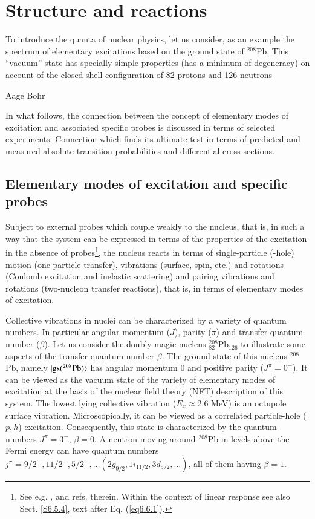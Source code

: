\chapter{Structure and reactions}\label{intro}
\epigraph{To introduce the quanta of nuclear physics, let us consider, as an example the spectrum of elementary excitations based on the ground state of $^{208}$Pb. This ``vacuum'' state has specially simple properties (has a minimum of degeneracy) on account of the closed-shell configuration of 82 protons and 126 neutrons}{Aage Bohr}
In what follows, the connection between the concept of elementary modes of excitation and associated specific probes is discussed in terms of selected experiments. Connection which finds its ultimate test in terms of predicted and measured absolute transition probabilities and differential cross sections. 
 \section{Elementary modes of excitation and specific probes}\label{S1.1}
Subject to external probes which couple weakly to the nucleus, that is, in such a way that the system can be expressed in terms of the properties of the excitation in the absence of probes\footnote{\label{f1C2} See e.g. \cite{Pines:66},\cite{Bohr:75} and refs. therein. Within the context of linear response see also Sect. \ref{S6.5.4}, text after Eq. (\ref{eq6.6.1}).}, the nucleus reacts  in terms  of single-particle (-hole) motion (one-particle transfer), vibrations (surface, spin, etc.) and rotations (Coulomb excitation and inelastic scattering) and pairing vibrations and rotations (two-nucleon transfer reactions), that is, in terms of elementary modes of excitation.


Collective vibrations in nuclei can be characterized by a variety of quantum numbers. In particular angular momentum ($J$), parity ($\pi$) and transfer quantum number ($\beta$). Let us consider the doubly magic nucleus $^{208}_{82}$Pb$_{126}$ to illustrate some aspects of the transfer quantum number $\beta$. The ground state of this nucleus $^{208}$Pb, namely $|{\text{gs}(^{208}\text{Pb})} \rangle$ has angular momentum 0 and positive parity ($J^\pi=0^+$). It can be viewed as the vacuum state of the variety of elementary modes of excitation at the basis of the nuclear field theory (NFT) description of this system. The lowest lying collective vibration ($E_x\approx2.6$ MeV) is an octupole surface vibration. Microscopically, it can be viewed as a correlated particle-hole ($p,h$) excitation. Consequently, this state is characterized by the quantum numbers $J^\pi=3^-$, $\beta=0$. A neutron moving around $^{208}$Pb in levels above the Fermi energy can have quantum numbers $j^\pi=9/2^+,11/2^+,5/2^+,\dots(2g_{9/2},1i_{11/2},3d_{5/2},\dots)$, all of them having  $\beta=1$.


